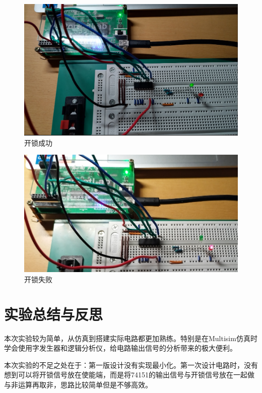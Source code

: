 \documentclass{ctexart}
\begin{document}
\begin{figure}[H]
    \centering
    \includegraphics[width=0.6\linewidth]{实物1.png}
    \caption{开锁成功}
    \label{fig:开锁成功}
\end{figure}
\begin{figure}[H]
    \centering
    \includegraphics[width=0.6\linewidth]{实物2.png}
    \caption{开锁失败}
    \label{fig:开锁失败}
\end{figure}
\section{实验总结与反思}
本次实验较为简单，从仿真到搭建实际电路都更加熟练。特别是在Multisim仿真时学会使用字发生器和逻辑分析仪，给电路输出信号的分析带来的极大便利。

本次实验的不足之处在于：第一版设计没有实现最小化。第一次设计电路时，没有想到可以将开锁信号放在使能端，而是将74151的输出信号与开锁信号放在一起做与非运算再取非，思路比较简单但是不够高效。
\end{document}
